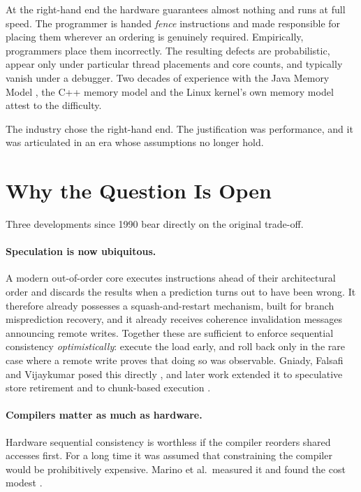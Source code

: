 At the right-hand end the hardware guarantees almost nothing and runs at full
speed. The programmer is handed \emph{fence} instructions and made responsible for
placing them wherever an ordering is genuinely required. Empirically, programmers
place them incorrectly.
The resulting defects are probabilistic, appear only under
particular thread placements and core counts, and typically vanish under a
debugger.
Two decades of experience with the Java Memory Model
\cite{manson2005java}, the C++ memory model \cite{boehm2008foundations} and the
Linux kernel's own memory model attest to the difficulty.

The industry chose the right-hand end.
The justification was performance, and it
was articulated in an era whose assumptions no longer hold.

\section{Why the Question Is Open}
\label{sec:why-open}

Three developments since 1990 bear directly on the original trade-off.

\paragraph{Speculation is now ubiquitous.} A modern out-of-order core executes
instructions ahead of their architectural order and discards the results when a
prediction turns out to have been wrong.
It therefore already possesses a
squash-and-restart mechanism, built for branch misprediction recovery, and it
already receives coherence invalidation messages announcing remote writes.
Together these are sufficient to enforce sequential consistency
\emph{optimistically}: execute the load early, and roll back only in the rare case
where a remote write proves that doing so was observable.
Gniady, Falsafi and
Vijaykumar posed this directly \cite{gniady1999sc}, and later work extended it to
speculative store retirement and to chunk-based execution
\cite{ceze2007bulksc,blundell2009invisifence}.

\paragraph{Compilers matter as much as hardware.} Hardware sequential consistency
is worthless if the compiler reorders shared accesses first.
For a long time it
was assumed that constraining the compiler would be prohibitively expensive.
Marino et al.\ measured it and found the cost modest \cite{marino2011sc}.

